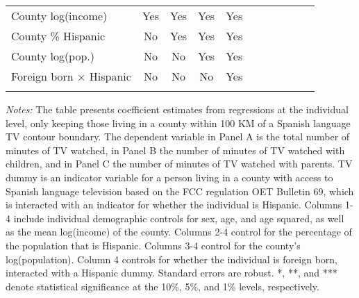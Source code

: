 \begin{table}[!htbp]
{\begin{threeparttable}
\begin{tabular}{lcccccccccc}
				County log(income) & Yes & Yes & Yes & Yes \\
				County \% Hispanic & No & Yes & Yes & Yes \\
				County log(pop.) & No & No & Yes & Yes \\
				Foreign born $\times$ Hispanic & No & No & No & Yes \\ 
				\addlinespace\hline\hline
			\end{tabular}
			\begin{tablenotes}[flushleft]
				\item \textit{Notes:} The table presents coefficient estimates from regressions at the individual level, only keeping those living in a county within 100 KM of a Spanish language TV contour boundary. The dependent variable in Panel A is the total number of minutes of TV watched, in Panel B the number of minutes of TV watched with children, and in Panel C the number of minutes of TV watched with parents. TV dummy is an indicator variable for a person living in a county with access to Spanish language television based on the FCC regulation OET Bulletin 69, which is interacted with an indicator for whether the individual is Hispanic. Columns 1-4 include individual demographic controls for sex, age, and age squared, as well as the mean log(income) of the county. Columns 2-4 control for the percentage of the population that is Hispanic. Columns 3-4 control for the county's log(population). Column 4 controls for whether the individual is foreign born, interacted with a Hispanic dummy. Standard errors are robust. *, **, and *** denote statistical significance at the 10\%, 5\%, and 1\% levels, respectively.
			\end{tablenotes}
		\end{threeparttable}
	}
\end{table}